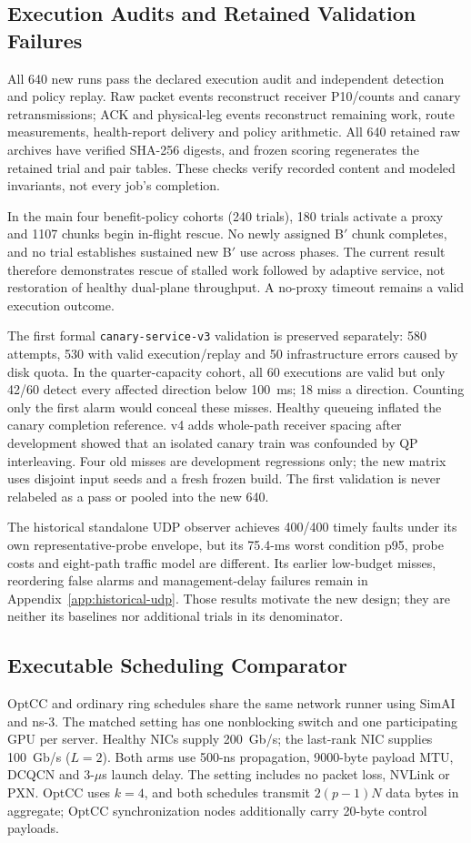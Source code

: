 \documentclass[sigconf]{acmart}
\begin{document}
\subsection{Execution Audits and Retained Validation Failures}
\label{sec:native-audit}
All 640 new runs pass the declared execution audit and independent detection
and policy replay. Raw packet events reconstruct receiver P10/counts and
canary retransmissions; ACK and physical-leg events reconstruct remaining
work, route measurements, health-report delivery and policy arithmetic.
All 640 retained raw archives have verified SHA-256 digests, and frozen
scoring regenerates the retained trial and pair tables. These checks verify
recorded content and modeled invariants, not every job's completion.

In the main four benefit-policy cohorts (240 trials), 180 trials activate a
proxy and 1107 chunks begin in-flight rescue. No newly assigned B$'$ chunk
completes, and no trial establishes sustained new B$'$ use across phases.
The current result therefore demonstrates rescue of stalled work followed
by adaptive service, not restoration of healthy dual-plane throughput.
A no-proxy timeout remains a valid execution outcome.

The first formal \texttt{canary-service-v3} validation is preserved separately:
580 attempts, 530 with valid execution/replay and 50 infrastructure errors
caused by disk quota. In the quarter-capacity cohort, all 60 executions are
valid but only 42/60 detect every affected direction below 100~ms; 18 miss
a direction. Counting only the first alarm would conceal these misses.
Healthy queueing inflated the canary completion reference. v4 adds whole-path
receiver spacing after development showed that an isolated canary train was
confounded by QP interleaving. Four old misses are development regressions
only; the new matrix uses disjoint input seeds and a fresh frozen build.
The first validation is never relabeled as a pass or pooled into the new 640.

The historical standalone UDP observer achieves 400/400 timely faults under
its own representative-probe envelope, but its 75.4-ms worst condition p95,
probe costs and eight-path traffic model are different. Its earlier low-budget
misses, reordering false alarms and management-delay failures remain in
Appendix~\ref{app:historical-udp}. Those results motivate the new design;
they are neither its baselines nor additional trials in its denominator.

\subsection{Executable Scheduling Comparator}
\label{sec:baseline-reproduction}
OptCC and ordinary ring schedules share the same network runner using
SimAI and ns-3. The matched setting has one nonblocking switch and one
participating GPU per server. Healthy NICs supply 200~Gb/s; the last-rank
NIC supplies 100~Gb/s ($L=2$). Both arms use 500-ns propagation,
9000-byte payload MTU, DCQCN and 3-$\mu$s launch delay. The setting
includes no packet loss, NVLink or PXN. OptCC uses
$k=4$, and both schedules transmit $2(p-1)N$ data bytes in aggregate;
OptCC synchronization nodes additionally carry 20-byte control payloads.
\end{document}
